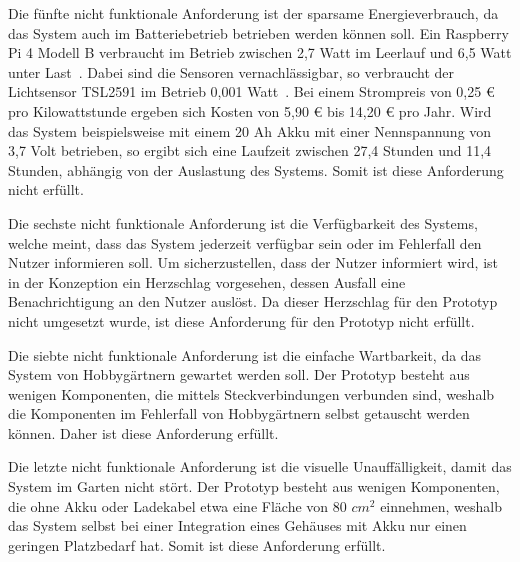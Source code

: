 Die fünfte nicht funktionale Anforderung ist der sparsame Energieverbrauch, da das System auch im Batteriebetrieb betrieben werden können soll.
Ein Raspberry Pi 4 Modell B verbraucht im Betrieb zwischen 2,7 Watt im Leerlauf und 6,5 Watt unter Last~\cite{RaspberryPi4Power}.
Dabei sind die Sensoren vernachlässigbar, so verbraucht der Lichtsensor TSL2591 im Betrieb 0,001 Watt~\cite{TSL2591}.
Bei einem Strompreis von 0,25 € pro Kilowattstunde ergeben sich Kosten von 5,90 € bis 14,20 € pro Jahr.
Wird das System beispielsweise mit einem 20 Ah Akku mit einer Nennspannung von 3,7 Volt betrieben, so ergibt sich eine Laufzeit zwischen 27,4 Stunden und 11,4 Stunden, abhängig von der Auslastung des Systems.
Somit ist diese Anforderung nicht erfüllt.

Die sechste nicht funktionale Anforderung ist die Verfügbarkeit des Systems, welche meint, dass das System jederzeit verfügbar sein oder im Fehlerfall den Nutzer informieren soll.
Um sicherzustellen, dass der Nutzer informiert wird, ist in der Konzeption ein Herzschlag vorgesehen, dessen Ausfall eine Benachrichtigung an den Nutzer auslöst.
Da dieser Herzschlag für den Prototyp nicht umgesetzt wurde, ist diese Anforderung für den Prototyp nicht erfüllt.

Die siebte nicht funktionale Anforderung ist die einfache Wartbarkeit, da das System von Hobbygärtnern gewartet werden soll.
Der Prototyp besteht aus wenigen Komponenten, die mittels Steckverbindungen verbunden sind, weshalb die Komponenten im Fehlerfall von Hobbygärtnern selbst getauscht werden können.
Daher ist diese Anforderung erfüllt.

Die letzte nicht funktionale Anforderung ist die visuelle Unauffälligkeit, damit das System im Garten nicht stört.
Der Prototyp besteht aus wenigen Komponenten, die ohne Akku oder Ladekabel etwa eine Fläche von $80$ $cm^2$ einnehmen, weshalb das System selbst bei einer Integration eines Gehäuses mit Akku nur einen geringen Platzbedarf hat.
Somit ist diese Anforderung erfüllt.



